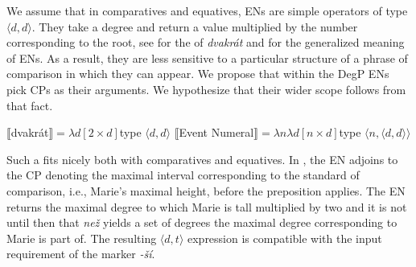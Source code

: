 \documentclass[output=paper,modfonts,hidelinks,newtxmath
\ChapterDOI{10.5281/zenodo.2545513}
]{langscibook}
\begin{document}
\noindent We assume that in comparatives and equatives, ENs are simple operators of type $\langle d,d\rangle$. They take a degree and return a value multiplied by the number corresponding to the  root, see  for the  of \textit{dvakrát} and  for the generalized meaning of ENs. As a result, they are less sensitive to a particular structure of a phrase of comparison in which they can appear. We propose that within the DegP ENs pick CPs as their arguments. We hypothesize that their wider scope follows from that fact.

\ea \ea $\llbracket$dvakrát$\rrbracket = \lambda d[2 \times d]$\hfill type $\langle d,d\rangle$\label{event-num-semantics-dvakrat}
\ex $\llbracket$Event Numeral$\rrbracket = \lambda n\lambda d[n \times d]$\hfill type $\langle n,\langle d,d\rangle\rangle$\label{event-num-semantics-abstract}
\z \z

\noindent Such a  fits nicely both with comparatives and equatives. In , the EN adjoins to the CP denoting the maximal interval corresponding to the standard of comparison, i.e., Marie's maximal height, before the  preposition applies. The EN returns the maximal degree to which Marie is tall multiplied by two and it is not until then that \textit{než} yields a set of degrees the maximal degree corresponding to Marie is part of. The resulting $\langle d,t\rangle$ expression is compatible with the input requirement of the  marker \textit{-ší}. 

\end{document}
